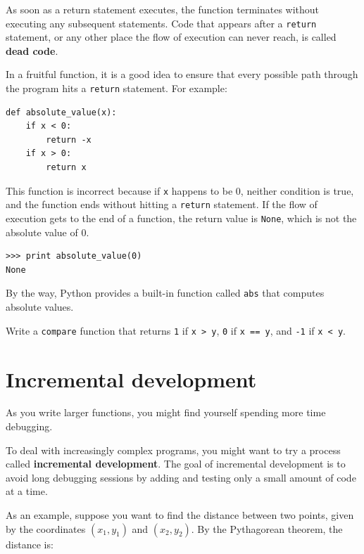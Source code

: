 \documentclass[10pt]{book}
\begin{document}
As soon as a return statement executes, the function
terminates without executing any subsequent statements.
Code that appears after a {\tt return} statement, or any other place
the flow of execution can never reach, is called {\bf dead code}.

In a fruitful function, it is a good idea to ensure
that every possible path through the program hits a
{\tt return} statement.  For example:

\begin{verbatim}
def absolute_value(x):
    if x < 0:
        return -x
    if x > 0:
        return x
\end{verbatim}
%
This function is incorrect because if {\tt x} happens to be 0,
neither condition is true, and the function ends without hitting a
{\tt return} statement.  If the flow of execution gets to the end
of a function, the return value is {\tt None}, which is not
the absolute value of 0.

\begin{verbatim}
>>> print absolute_value(0)
None
\end{verbatim}
%
By the way, Python provides a built-in function called 
{\tt abs} that computes absolute values.

\begin{exercise}

Write a {\tt compare} function
that returns {\tt 1} if {\tt x > y},
{\tt 0} if {\tt x == y}, and {\tt -1} if {\tt x < y}.
\end{exercise}


\section{Incremental development}
\label{incremental.development}

As you write larger functions, you might find yourself
spending more time debugging.

To deal with increasingly complex programs,
you might want to try a process called
{\bf incremental development}.  The goal of incremental development
is to avoid long debugging sessions by adding and testing only
a small amount of code at a time.

As an example, suppose you want to find the distance between two
points, given by the coordinates $(x_1, y_1)$ and $(x_2, y_2)$.
By the Pythagorean theorem, the distance is:
\end{document}
